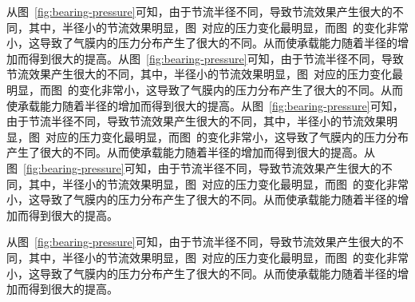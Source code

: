 \documentclass[a4paper, twoside, openany]{NCEPUDoctor}
\begin{document}
  从图~\ref{fig:bearing-pressure}可知，由于节流半径不同，导致节流效果产生很大的不同，其中，半径小的节流效果明显，图~对应的压力变化最明显，而图~的变化非常小，这导致了气膜内的压力分布产生了很大的不同。从而使承载能力随着半径的增加而得到很大的提高。从图~\ref{fig:bearing-pressure}可知，由于节流半径不同，导致节流效果产生很大的不同，其中，半径小的节流效果明显，图~对应的压力变化最明显，而图~的变化非常小，这导致了气膜内的压力分布产生了很大的不同。从而使承载能力随着半径的增加而得到很大的提高。从图~\ref{fig:bearing-pressure}可知，由于节流半径不同，导致节流效果产生很大的不同，其中，半径小的节流效果明显，图~对应的压力变化最明显，而图~的变化非常小，这导致了气膜内的压力分布产生了很大的不同。从而使承载能力随着半径的增加而得到很大的提高。从图~\ref{fig:bearing-pressure}可知，由于节流半径不同，导致节流效果产生很大的不同，其中，半径小的节流效果明显，图~对应的压力变化最明显，而图~的变化非常小，这导致了气膜内的压力分布产生了很大的不同。从而使承载能力随着半径的增加而得到很大的提高。

  从图~\ref{fig:bearing-pressure}可知，由于节流半径不同，导致节流效果产生很大的不同，其中，半径小的节流效果明显，图~对应的压力变化最明显，而图~的变化非常小，这导致了气膜内的压力分布产生了很大的不同。从而使承载能力随着半径的增加而得到很大的提高。
\end{document}
